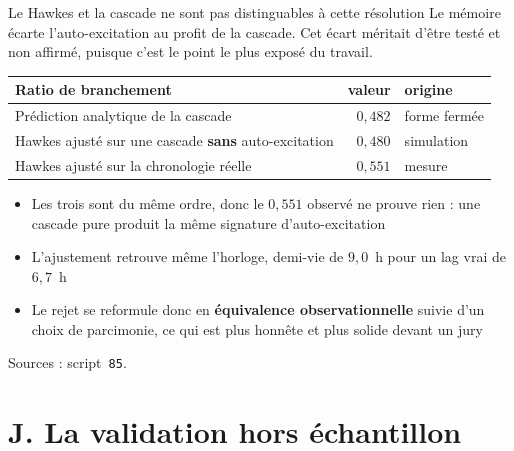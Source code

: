 \documentclass[11pt]{beamer}
\begin{document}
\begin{frame}{Le Hawkes et la cascade ne sont pas distinguables à cette résolution}
\small
Le mémoire écarte l'auto-excitation au profit de la cascade. Cet écart méritait d'être testé et
non affirmé, puisque c'est le point le plus exposé du travail.
\vspace{1mm}

\begin{center}\small
\begin{tabular}{@{}l r l@{}}
\toprule
\textbf{Ratio de branchement} & \textbf{valeur} & \textbf{origine} \\
\midrule
Prédiction analytique de la cascade & $0{,}482$ & forme fermée \\
Hawkes ajusté sur une cascade \textbf{sans} auto-excitation & $0{,}480$ & simulation \\
Hawkes ajusté sur la chronologie réelle & $0{,}551$ & mesure \\
\bottomrule
\end{tabular}
\end{center}
\vspace{2mm}

\begin{itemize}\itemsep4pt
  \item \alert{Les trois sont du même ordre, donc le $0{,}551$ observé ne prouve rien} : une
        cascade pure produit la même signature d'auto-excitation
  \item L'ajustement retrouve même l'horloge, demi-vie de $9{,}0$~h pour un lag vrai de
        $6{,}7$~h
  \item Le rejet se reformule donc en \textbf{équivalence observationnelle} suivie d'un choix
        de parcimonie, ce qui est plus honnête et plus solide devant un jury
\end{itemize}
\vspace{1mm}
{\scriptsize Sources : script~\texttt{85}.}
\end{frame}

\section*{J. La validation hors échantillon}
\end{document}

